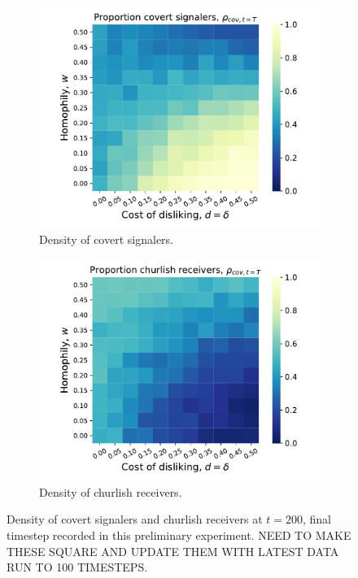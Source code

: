 \documentclass[11pt,letterpaper]{article}
\begin{document}
\begin{figure}[H]
  \centering
  \begin{subfigure}{0.49\textwidth}
    \centering
    \includegraphics[width=\textwidth]{Figures/basic_disliking_signaling.pdf}
    \caption{Density of covert signalers.}
  \end{subfigure}
  \begin{subfigure}{0.49\textwidth}
    \centering
    \includegraphics[width=\textwidth]{Figures/basic_disliking_receiving.pdf}
    \caption{Density of churlish receivers.}
  \end{subfigure}
  
  \caption{Density of covert signalers and churlish receivers at $t=200$, 
    final timestep recorded in this preliminary experiment. NEED TO MAKE THESE
    SQUARE AND UPDATE THEM WITH LATEST DATA RUN TO 100 TIMESTEPS.}
  \label{fig:dislikingHomophilyHeatmap}
\end{figure}
\end{document}
